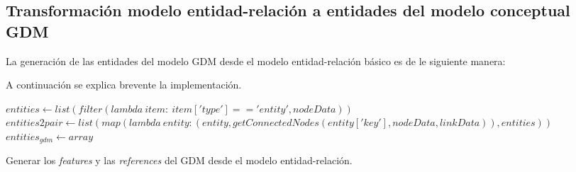 \subsection{Transformación modelo entidad-relación a entidades del modelo conceptual GDM}
La generación de las entidades del modelo GDM desde el modelo entidad-relación básico es de le siguiente manera: 


A continuación se explica brevente la implementación.

\begin{algorithm}[H]

  $entities \gets  list(filter(lambda\ item:\ item['type'] == 'entity',nodeData))$\\
    $entities2pair \gets  list(map(lambda\ entity: (entity, getConnectedNodes(entity['key'], nodeData, linkData)),entities))$\\
    $entities_{gdm} \gets  array$\\
    
  \caption{Generar los \textit{features} y las \textit{references} del GDM desde el modelo entidad-relación.}
\end{algorithm}

